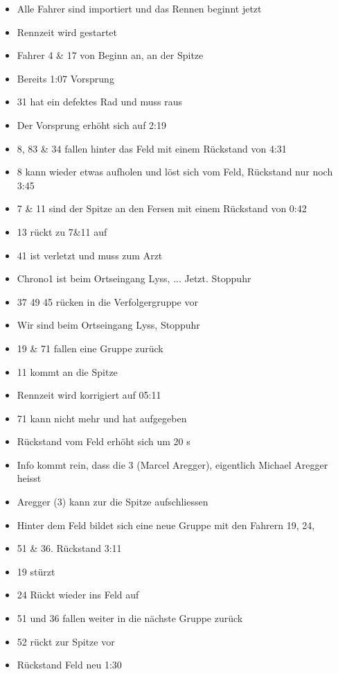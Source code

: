 \begin{itemize}
\item Alle Fahrer sind importiert und das Rennen beginnt jetzt
\item Rennzeit wird gestartet
\item Fahrer 4 \& 17 von Beginn an, an der Spitze
\item Bereits 1:07 Vorsprung
\item 31 hat ein defektes Rad und muss raus
\item Der Vorsprung erhöht sich auf 2:19
\item 8, 83 \& 34 fallen hinter das Feld mit einem Rückstand von 4:31
\item 8 kann wieder etwas aufholen und löst sich vom Feld, Rückstand nur noch 3:45
\item 7 \& 11 sind der Spitze an den Fersen mit einem Rückstand von 0:42
\item 13 rückt zu 7\&11 auf
\item 41 ist verletzt und muss zum Arzt
\item Chrono1 ist beim Ortseingang Lyss, ... Jetzt. Stoppuhr
\item 37 49 45 rücken in die Verfolgergruppe vor
\item Wir sind beim Ortseingang Lyss, Stoppuhr
\item 19 \& 71 fallen eine Gruppe zurück
\item 11 kommt an die Spitze
\item Rennzeit wird korrigiert auf 05:11
\item 71 kann nicht mehr und hat aufgegeben
\item Rückstand vom Feld erhöht sich um 20 s
\item Info kommt rein, dass die 3 (Marcel Aregger), eigentlich Michael Aregger heisst
\item Aregger (3) kann zur die Spitze aufschliessen
\item Hinter dem Feld bildet sich eine neue Gruppe mit den Fahrern 19, 24, \item 51 \& 36. Rückstand 3:11
\item 19 stürzt
\item 24 Rückt wieder ins Feld auf
\item 51 und 36 fallen weiter in die nächste Gruppe zurück
\item 52 rückt zur Spitze vor
\item Rückstand Feld neu 1:30
\end{itemize}

